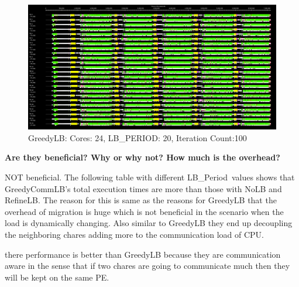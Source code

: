 \documentclass[10pt,times]{report}
\newcommand{\lbp}{LB\_Period}
\begin{document}
  \begin{figure}[htbp]
    \begin{center}
       \includegraphics{TL_100_20_GCLB_24.png} 
    \end{center}
    \caption{GreedyLB: Cores: 24, LB\_PERIOD: 20, Iteration Count:100}
      \label{fig:3} 
  \end{figure}

  \begin{flushleft}
    \textbf{Are   they   beneficial?   Why   or   why   not?   How   much   is   the   overhead?}  
  \end{flushleft}
  NOT beneficial. The following table with different \lbp\ values shows that
  GreedyCommLB's total execution times are  more than those with NoLB and
  RefineLB.  The reason for this is same as the reasons for GreedyLB that the
  overhead of migration is huge which is not beneficial in the scenario when
  the load is dynamically changing. Also similar to GreedyLB they end up
  decoupling the neighboring chares adding more to the communication load of
  CPU.
  
   there performance is better than GreedyLB because they are
  communication aware in the sense that if two chares are going to communicate
  much then they will be kept on the same PE.
\end{document}
